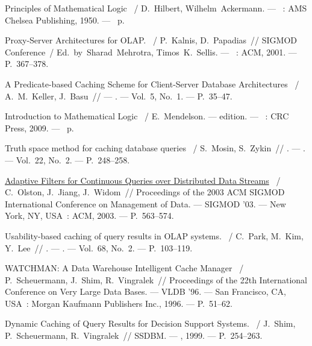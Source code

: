 \documentclass{cmi}
\begin{document}
\begin{biblio_lat}
	 Principles of Mathematical Logic ~/
	D.~Hilbert, Wilhelm~Ackermann. ---
	\newblock [S.\ l.]~: AMS Chelsea Publishing, 1950. ---
	~p.
	
	 Proxy-Server Architectures for OLAP. ~/
	P.~Kalnis, D.~Papadias~// SIGMOD Conference~/ Ed.\ by\
	Sharad~Mehrotra, Timos~K.~Sellis. ---
	\newblock [S.\ l.]~: ACM, 2001. ---
	\newblock P.~367--378.
	
	 A Predicate-based Caching Scheme for Client-Server
	Database Architectures ~/ A.~M.~Keller, J.~Basu~//  ---
	. ---
	\newblock Vol.~5, No.~1. ---
	\newblock P.~35--47.
	
	 Introduction to Mathematical Logic ~/
	E.~Mendelson. ---
	 edition. ---
	\newblock [S.\ l.]~: CRC Press, 2009. ---
	~p.
	
	 Truth space method for caching database queries
	~/ S.~Mosin, S.~Zykin~// . ---
	. ---
	\newblock Vol.~22, No.~2. ---
	\newblock P.~248--258.
	
	\href{http://dx.doi.org/10.1145/872757.872825}{Adaptive Filters for
		Continuous Queries over Distributed Data Streams} ~/ C.~Olston,
	J.~Jiang, J.~Widom~// Proceedings of the 2003 ACM SIGMOD
	International Conference on Management of Data. ---
	\newblock SIGMOD '03. ---
	\newblock New York, NY, USA~: ACM, 2003. ---
	\newblock P.~563--574.
	
	 Usability-based caching of query results in OLAP
	systems. ~/ C.~Park, M.~Kim, Y.~Lee~//
	. ---
	. ---
	\newblock Vol.~68, No.~2. ---
	\newblock P.~103--119.
	
	 WATCHMAN: A Data Warehouse Intelligent Cache
	Manager ~/ P.~Scheuermann, J.~Shim, R.~Vingralek~//
	Proceedings of the 22th International Conference on Very Large Data Bases.
	---
	\newblock VLDB '96. ---
	\newblock San Francisco, CA, USA~: Morgan Kaufmann Publishers Inc., 1996. ---
	\newblock P.~51--62.
	
	 Dynamic Caching of Query Results for Decision Support
	Systems. ~/ J.~Shim, P.~Scheuermann, R.~Vingralek~// SSDBM.
	---
	\newblock [S.\ l.~: s.\ n.], 1999. ---
	\newblock P.~254--263.
\end{biblio_lat}

\end{document}
